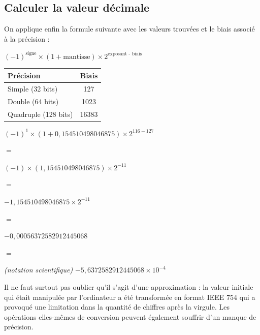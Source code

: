 \documentclass[11pt,a4paper]{article}
\begin{document}
\bigskip

\subsection{Calculer la valeur décimale}

\medskip

On applique enfin la formule suivante avec les valeurs trouvées et le biais associé à la précision :

\begin{table}[ht!]
  \centering
  \begin{minipage}{0.45\textwidth}
    \centering

\begin{center}
$ (-1)^{\text{signe}} \times (1 + \text{mantisse}) \times 2^{\text{exposant - biais}} $
\end{center}

  \end{minipage}
  \hfillx
  \begin{minipage}{0.45\textwidth}
    \centering

\begin{tabular}{| l | c |}
\hline
Précision & Biais \\
\hline
Simple (32 bits)  & 127 \\
\hline
Double (64 bits)  & 1023 \\
\hline
Quadruple (128 bits) & 16383 \\
\hline
\end{tabular}

  \end{minipage}
\end{table}


\begin{center}
$ (-1)^{1} \times (1 + 0,154510498046875) \times 2^{116 - 127} $

\smallskip
$ = $
\smallskip

$ (-1) \times (1,154510498046875) \times 2^{-11} $

\smallskip
$ = $
\smallskip

$ -1,154510498046875 \times 2^{-11} $

\smallskip
$ = $
\smallskip

$ -0,00056372582912445068 $

\smallskip
$ = $
\smallskip

\textit{(notation scientifique)} $ -5,6372582912445068 \times 10^{-4} $
\end{center}

Il ne faut surtout pas oublier qu'il s'agit d'une approximation : la valeur initiale qui était manipulée par l'ordinateur a été transformée en format IEEE 754 qui a provoqué une limitation dans la quantité de chiffres après la virgule.
Les opérations elles-mêmes de conversion peuvent également souffrir d'un manque de précision.
\end{document}
